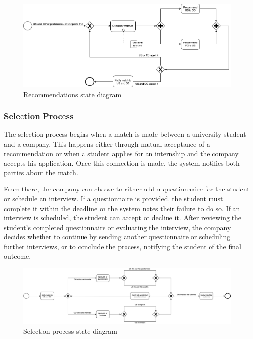 \begin{figure}
    \centering
    \includegraphics[width=14cm]{images/state-diagrams/recommendations.png}
    \caption{Recommendations state diagram}
\end{figure}

\subsubsection{Selection Process}
The selection process begins when a match is made between a university student and a company.
This happens either through mutual acceptance of a recommendation or when a student applies for an internship and the company accepts his application.
Once this connection is made, the system notifies both parties about the match.

From there, the company can choose to either add a questionnaire for the student or schedule an interview.
If a questionnaire is provided, the student must complete it within the deadline or the system notes their failure to do so.
If an interview is scheduled, the student can accept or decline it.
After reviewing the student’s completed questionnaire or evaluating the interview, the company decides whether to continue by sending another questionnaire or scheduling further interviews, or to conclude the process, notifying the student of the final outcome.

\begin{figure}
    \centering
    \includegraphics[width=16cm]{images/state-diagrams/selection-process.png}
    \caption{Selection process state diagram}
\end{figure}

